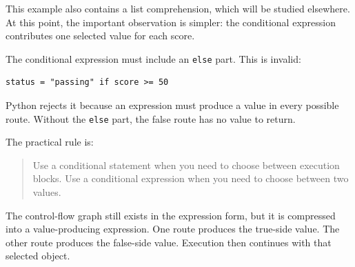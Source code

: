 This example also contains a list comprehension, which will be studied elsewhere. At this point, the important observation is simpler: the conditional expression contributes one selected value for each score.

The conditional expression must include an \texttt{else} part. This is invalid:

\begin{verbatim}
status = "passing" if score >= 50
\end{verbatim}

Python rejects it because an expression must produce a value in every possible route. Without the \texttt{else} part, the false route has no value to return.

The practical rule is:

\begin{quote}
Use a conditional statement when you need to choose between execution blocks. Use a conditional expression when you need to choose between two values.
\end{quote}

The control-flow graph still exists in the expression form, but it is compressed into a value-producing expression. One route produces the true-side value. The other route produces the false-side value. Execution then continues with that selected object.